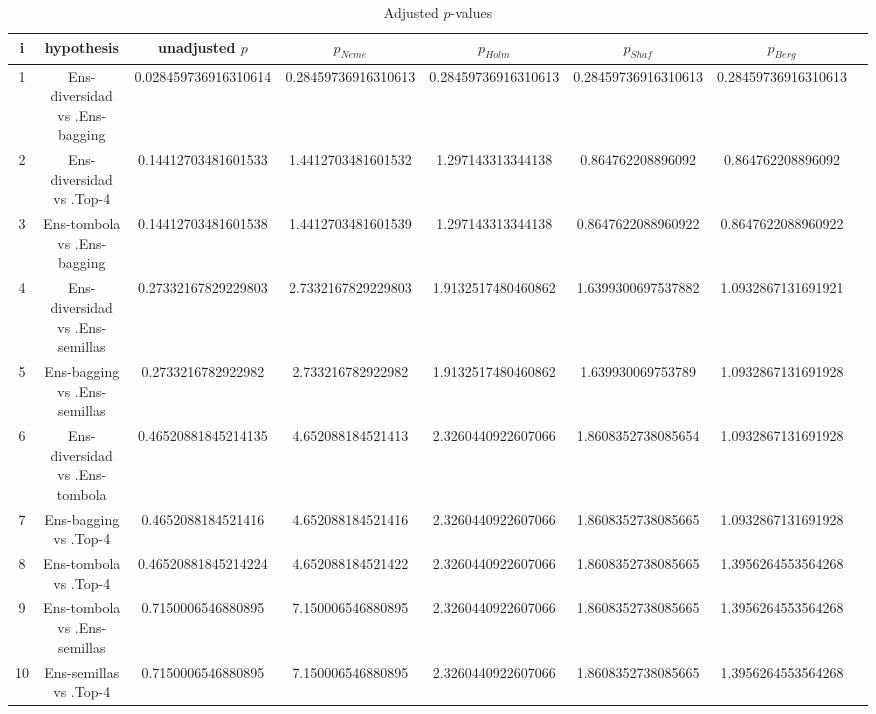 \documentclass[a4paper,10pt]{article}
\begin{document}
\begin{landscape}
\begin{table}[!htp]
\centering\tiny
\caption{Adjusted $p$-values}
\begin{tabular}{cccccccc}
i&hypothesis&unadjusted $p$&$p_{Neme}$&$p_{Holm}$&$p_{Shaf}$&$p_{Berg}$\\
\hline
1&Ens-diversidad vs .Ens-bagging&0.028459736916310614&0.28459736916310613&0.28459736916310613&0.28459736916310613&0.28459736916310613\\
2&Ens-diversidad vs .Top-4&0.14412703481601533&1.4412703481601532&1.297143313344138&0.864762208896092&0.864762208896092\\
3&Ens-tombola vs .Ens-bagging&0.14412703481601538&1.4412703481601539&1.297143313344138&0.8647622088960922&0.8647622088960922\\
4&Ens-diversidad vs .Ens-semillas&0.27332167829229803&2.7332167829229803&1.9132517480460862&1.6399300697537882&1.0932867131691921\\
5&Ens-bagging vs .Ens-semillas&0.2733216782922982&2.733216782922982&1.9132517480460862&1.639930069753789&1.0932867131691928\\
6&Ens-diversidad vs .Ens-tombola&0.46520881845214135&4.652088184521413&2.3260440922607066&1.8608352738085654&1.0932867131691928\\
7&Ens-bagging vs .Top-4&0.4652088184521416&4.652088184521416&2.3260440922607066&1.8608352738085665&1.0932867131691928\\
8&Ens-tombola vs .Top-4&0.46520881845214224&4.652088184521422&2.3260440922607066&1.8608352738085665&1.3956264553564268\\
9&Ens-tombola vs .Ens-semillas&0.7150006546880895&7.150006546880895&2.3260440922607066&1.8608352738085665&1.3956264553564268\\
10&Ens-semillas vs .Top-4&0.7150006546880895&7.150006546880895&2.3260440922607066&1.8608352738085665&1.3956264553564268\\
\hline
\end{tabular}
\end{table}

\end{landscape}
\end{document}
